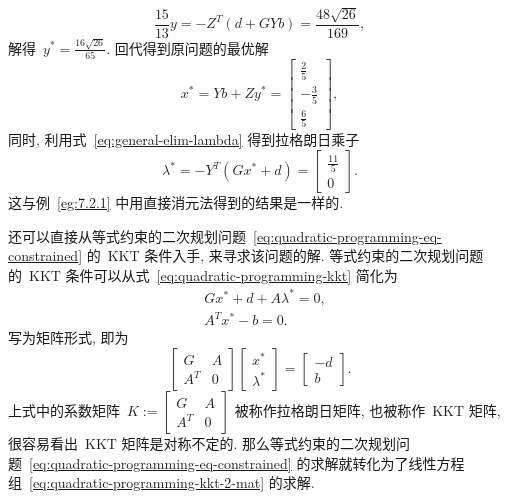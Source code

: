 \begin{exam}
\begin{equation*}
\frac{15}{13} y = - Z^T \left( d + G Y b \right) = \frac{48 \sqrt{26}}{169},
\end{equation*}
解得~$y^* = \frac{16 \sqrt{26}}{65}.$ 回代得到原问题的最优解
\begin{equation*}
{x}^* = Y {b} + Z y^* = \left[\begin{matrix} \frac{2}{5} \\ - \frac{3}{5} \\ \frac{6}{5} \end{matrix}\right],
\end{equation*}
同时, 利用式~\eqref{eq:general-elim-lambda} 得到拉格朗日乘子
\begin{equation*}
{\lambda}^* = - Y^T \left( G {x}^* + {d} \right) = \left[\begin{matrix} \frac{11}{5} \\ 0 \end{matrix}\right].
\end{equation*}
这与例~\eqref{eg:7.2.1} 中用直接消元法得到的结果是一样的.
\end{exam}

还可以直接从等式约束的二次规划问题~\eqref{eq:quadratic-programming-eq-constrained} 的~KKT 条件入手,  来寻求该问题的解. 等式约束的二次规划问题的~KKT 条件可以从式~\eqref{eq:quadratic-programming-kkt} 简化为
\begin{equation}
\label{eq:quadratic-programming-kkt-2}
\begin{aligned}
& G {x}^* + {d} + A {\lambda}^* = {0}, \\
& A^T {x}^* - {b} = {0}.
\end{aligned}
\end{equation}
写为矩阵形式, 即为
\begin{equation}
\label{eq:quadratic-programming-kkt-2-mat}
\begin{bmatrix} G & A \\ A^T & 0 \end{bmatrix} \begin{bmatrix} {x}^* \\ {\lambda}^* \end{bmatrix} = \begin{bmatrix} -{d} \\ {b} \end{bmatrix}.
\end{equation}
上式中的系数矩阵~$K := \begin{bmatrix} G & A \\ A^T & 0 \end{bmatrix}$ 被称作拉格朗日矩阵, 
也被称作~KKT 矩阵, 很容易看出~KKT 矩阵是对称不定的.
 那么等式约束的二次规划问题~\eqref{eq:quadratic-programming-eq-constrained} 的求解就转化为了线性方程组~\eqref{eq:quadratic-programming-kkt-2-mat} 的求解.

